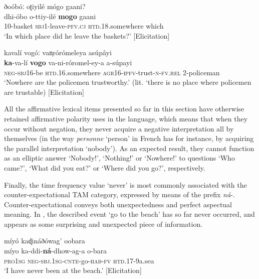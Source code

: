 \documentclass[output=paper,colorlinks=true, citecolor=brown,draftmode]{langscibook}
\begin{document}
    \ex\label{ex:cuw:60b} ðoóbóː oʈiyilé mógo gaani? \\
        \gll dhi-óbo o-ttiy-ilé \textbf{mogo} gaani  \\
              10-basket \textsc{sbj1}-leave-\textsc{pfv.cj} \textsc{htd.18}.somewhere which \\
        \glt  ‘In which place did he leave the baskets?’ [Elicitation]

    \ex\label{ex:cuw:60c} kavalí vogóː van̩rórómeleya asúpâyi\\
        \gll  \textbf{ka}{}-va-lí \textbf{vogo} va-ni-róromel-ey-a a-súpayi \\
            \textsc{neg-sbj1}6-be \textsc{htd.16}.somewhere \textsc{agr}16-\textsc{ipfv}{}-trust-\textsc{n-fv.rel} 2-policeman \\
        \glt   ‘Nowhere are the policemen trustworthy.’ (lit. ‘there is no place where policemen are trustable) [Elicitation]
 
    \z
\z 

All the affirmative lexical items presented so far in this section have otherwise retained affirmative polarity uses in the language, which means that when they occur without negation, they never acquire a negative interpretation all by themselves (in the way \textit{personne} ‘person’ in French has for instance, by acquiring the parallel interpretation ‘nobody’). As an expected result, they cannot function as an elliptic answer ‘Nobody!’, ‘Nothing!’ or ‘Nowhere!’ to questions ‘Who came?’, ‘What did you eat?’ or ‘Where did you go?’, respectively.

Finally, the time frequency value ‘never’ is most commonly associated with the counter-expectational TAM category, expressed by means of the prefix \textit{ná}{}-. Counter-expectational conveys both unexpectedness and perfect aspectual meaning. In , the described event ‘go to the beach’ has so far never occurred, and appears as some surprising and unexpected piece of information.

\ea\label{ex:cuw:61} míyó kaɖináðówag’ oobara\\ 
    \gll míyo ka-ddi-\textbf{ná}{}-dhow-ag-a o-bara\\
          \textsc{pro1sg} \textsc{neg-sbj.1sg-cnte}{}-go-\textsc{hab-fv} \textsc{htd.17}{}-9a.sea \\
    \glt  ‘I have never been at the beach.’ [Elicitation]

\z 
\end{document}
